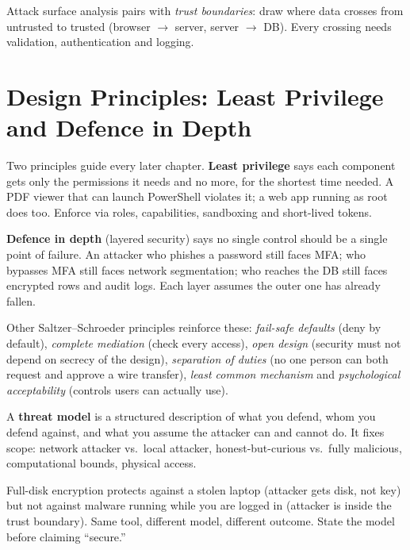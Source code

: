 Attack surface analysis pairs with \emph{trust boundaries}: draw where data crosses from untrusted to trusted (browser $\to$ server, server $\to$ DB). Every crossing needs validation, authentication and logging.

\section{Design Principles: Least Privilege and Defence in Depth}
\label{sec:principles}
Two principles guide every later chapter. \textbf{Least privilege} says each component gets only the permissions it needs and no more, for the shortest time needed. A PDF viewer that can launch PowerShell violates it; a web app running as root does too. Enforce via roles, capabilities, sandboxing and short-lived tokens.

\textbf{Defence in depth} (layered security) says no single control should be a single point of failure. An attacker who phishes a password still faces MFA; who bypasses MFA still faces network segmentation; who reaches the DB still faces encrypted rows and audit logs. Each layer assumes the outer one has already fallen.

Other Saltzer--Schroeder principles reinforce these: \emph{fail-safe defaults} (deny by default), \emph{complete mediation} (check every access), \emph{open design} (security must not depend on secrecy of the design), \emph{separation of duties} (no one person can both request and approve a wire transfer), \emph{least common mechanism} and \emph{psychological acceptability} (controls users can actually use).

\begin{definition}
A \textbf{threat model} is a structured description of what you defend, whom you defend against, and what you assume the attacker can and cannot do. It fixes scope: network attacker vs.\ local attacker, honest-but-curious vs.\ fully malicious, computational bounds, physical access.
\end{definition}

\begin{example}
Full-disk encryption protects against a stolen laptop (attacker gets disk, not key) but not against malware running while you are logged in (attacker is inside the trust boundary). Same tool, different model, different outcome. State the model before claiming ``secure.''
\end{example}

